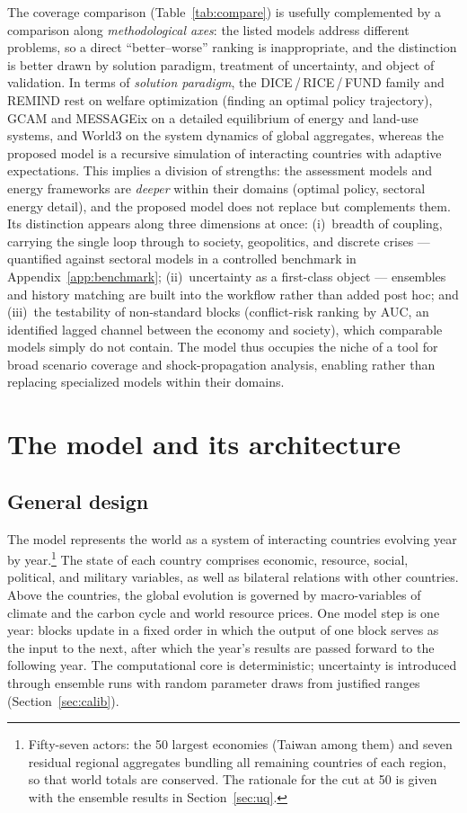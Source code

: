 \documentclass[a4paper,fleqn]{cas-sc}
\begin{document}
The coverage comparison (Table~\ref{tab:compare}) is usefully complemented by a comparison along
\emph{methodological axes}: the listed models address different problems, so a direct
``better--worse'' ranking is inappropriate, and the distinction is better drawn by solution
paradigm, treatment of uncertainty, and object of validation. In terms of \emph{solution paradigm},
the DICE\,/\,RICE\,/\,FUND family and REMIND rest on welfare optimization (finding an optimal policy
trajectory), GCAM and MESSAGEix on a detailed equilibrium of energy and land-use systems, and World3
on the system dynamics of global aggregates, whereas the proposed model is a recursive simulation of
interacting countries with adaptive expectations. This implies a division of strengths: the
assessment models and energy frameworks are \emph{deeper} within their domains (optimal policy,
sectoral energy detail), and the proposed model does not replace but complements them. Its distinction appears along three dimensions at once: {(i)}~breadth of coupling, carrying the single loop through to
society, geopolitics, and discrete crises --- quantified against sectoral models in a controlled
benchmark in Appendix~\ref{app:benchmark}; {(ii)}~uncertainty as a first-class object ---
ensembles and history matching are built into the workflow rather than added post hoc; and
{(iii)}~the testability of non-standard blocks (conflict-risk ranking by AUC, an identified
lagged channel between the economy and society), which comparable models simply do not contain. The
model thus occupies the niche of a tool for broad scenario coverage and shock-propagation analysis,
enabling rather than replacing specialized models within their domains.

\section{The model and its architecture}


\subsection{General design}

The model represents the world as a system of interacting countries evolving year by
year.\footnote{Fifty-seven actors: the 50 largest economies (Taiwan among them) and seven residual
regional aggregates bundling all remaining countries of each region, so that world totals are
conserved. The rationale for the cut at 50 is given with the ensemble results in
Section~\ref{sec:uq}.} The state of
each country comprises economic, resource, social, political, and military variables, as well as
bilateral relations with other countries. Above the countries, the global evolution is governed by macro-variables of climate and the carbon cycle and world resource prices. One model step is one year: blocks update in a fixed order in which the output of one block serves as the input to the next, after which the year's results are passed forward to the following year. The computational core is deterministic;
uncertainty is introduced through ensemble runs with random parameter draws from justified ranges
(Section~\ref{sec:calib}).
\end{document}
